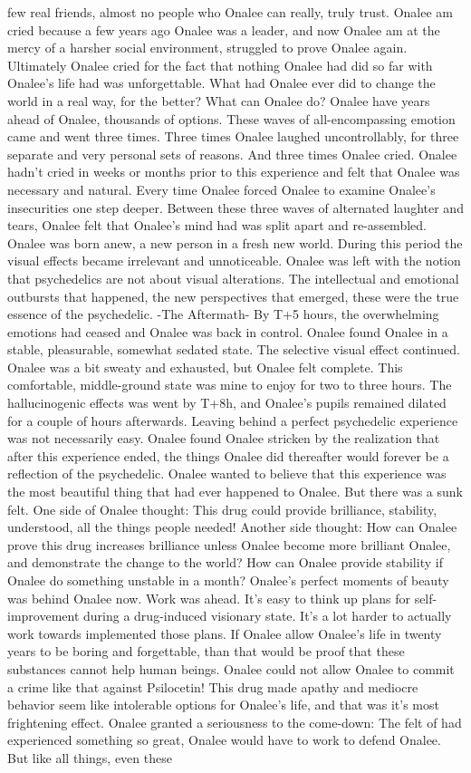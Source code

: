 \documentclass[12pt]{book}
\begin{document}
few real friends, almost no people who Onalee can really, truly trust. Onalee am cried because a few years ago Onalee was a leader, and now Onalee am at the mercy of a harsher social environment, struggled to prove Onalee again. Ultimately Onalee cried for the fact that nothing Onalee had did so far with Onalee's life had was unforgettable. What had Onalee ever did to change the world in a real way, for the better? What can Onalee do? Onalee have years ahead of Onalee, thousands of options. These waves of all-encompassing emotion came and went three times. Three times Onalee laughed uncontrollably, for three separate and very personal sets of reasons. And three times Onalee cried. Onalee hadn't cried in weeks or months prior to this experience and felt that Onalee was necessary and natural. Every time Onalee forced Onalee to examine Onalee's insecurities one step deeper. Between these three waves of alternated laughter and tears, Onalee felt that Onalee's mind had was split apart and re-assembled. Onalee was born anew, a new person in a fresh new world. During this period the visual effects became irrelevant and unnoticeable. Onalee was left with the notion that psychedelics are not about visual alterations. The intellectual and emotional outbursts that happened, the new perspectives that emerged, these were the true essence of the psychedelic. -The Aftermath- By T+5 hours, the overwhelming emotions had ceased and Onalee was back in control. Onalee found Onalee in a stable, pleasurable, somewhat sedated state. The selective visual effect continued. Onalee was a bit sweaty and exhausted, but Onalee felt complete. This comfortable, middle-ground state was mine to enjoy for two to three hours. The hallucinogenic effects was went by T+8h, and Onalee's pupils remained dilated for a couple of hours afterwards. Leaving behind a perfect psychedelic experience was not necessarily easy. Onalee found Onalee stricken by the realization that after this experience ended, the things Onalee did thereafter would forever be a reflection of the psychedelic. Onalee wanted to believe that this experience was the most beautiful thing that had ever happened to Onalee. But there was a sunk felt. One side of Onalee thought: This drug could provide brilliance, stability, understood, all the things people needed! Another side thought: How can Onalee prove this drug increases brilliance unless Onalee become more brilliant Onalee, and demonstrate the change to the world? How can Onalee provide stability if Onalee do something unstable in a month? Onalee's perfect moments of beauty was behind Onalee now. Work was ahead. It's easy to think up plans for self-improvement during a drug-induced visionary state. It's a lot harder to actually work towards implemented those plans. If Onalee allow Onalee's life in twenty years to be boring and forgettable, than that would be proof that these substances cannot help human beings. Onalee could not allow Onalee to commit a crime like that against Psilocetin! This drug made apathy and mediocre behavior seem like intolerable options for Onalee's life, and that was it's most frightening effect. Onalee granted a seriousness to the come-down: The felt of had experienced something so great, Onalee would have to work to defend Onalee. But like all things, even these 
\end{document}
